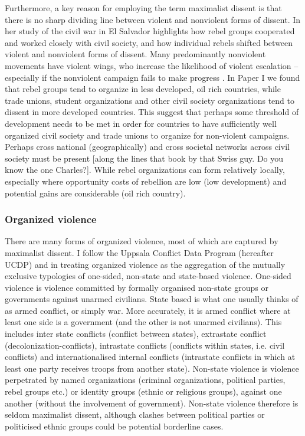 Furthermore, a key reason for employing the term maximalist dissent is that
there is no sharp dividing line between violent and nonviolent forms of dissent.
In her study of the civil war in El Salvador \citet{Wood2003} highlights how
rebel groups cooperated and worked closely with civil society, and how
individual rebels shifted between violent and nonviolent forms of dissent. Many
predominantly nonviolent movements have violent wings, who increase the
likelihood of violent escalation -- especially if the nonviolent campaign fails
to make progress \citep{Ryckman_2019}. In Paper I we found that rebel groups
tend to organize in less developed, oil rich countries, while trade unions,
student organizations and other civil society organizations tend to dissent in
more developed countries. This suggest that perhaps some threshold of
development needs to be met in order for countries to have sufficiently well
organized civil society and trade unions to organize for non-violent campaigns.
Perhaps cross national (geographically) and cross societal networks across civil
society must be present [along the lines that book by that Swiss guy. Do you
know the one Charles?]. While rebel organizations can form relatively locally,
especially where opportunity costs of rebellion are low (low development) and
potential gains are considerable (oil rich country).

\subsubsection{Organized violence}
\label{Organized violence}

There are many forms of organized violence, most of which are captured by
maximalist dissent. I follow the Uppsala Conflict Data Program (hereafter UCDP)
and \citet{Melander_2016} in treating organized violence as the aggregation of
the mutually exclusive typologies of one-sided, non-state and state-based
violence. One-sided violence is violence committed by formally organised
non-state groups or governments against unarmed civilians. State based is what
one usually thinks of as armed conflict, or simply war. More accurately, it is
armed conflict where at least one side is a government (and the other is not
unarmed civilians). This includes inter state conflicts (conflict between
states), extrastate conflict (decolonization-conflicts), intrastate conflicts
(conflicts within states, i.e. civil conflicts) and internationalised internal
conflicts (intrastate conflicts in which at least one party receives troops from
another state). Non-state violence is violence perpetrated by named
organizations (criminal organizations, political parties, rebel groups etc.) or
identity groups (ethnic or religious groups), against one another (without the
involvement of government). Non-state violence therefore is seldom 
maximalist dissent, although clashes between political parties or politicised
ethnic groups could be potential borderline cases.

